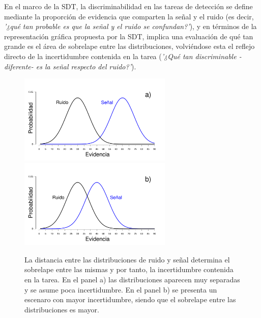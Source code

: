 En el marco de la SDT, la discriminabilidad en las tareas de detección se define mediante la proporción de evidencia que comparten la señal y el ruido (es decir, \textit{'¿qué tan probable es que la señal y el ruido se confundan?'}), y en términos de la representación gráfica propuesta por la SDT, implica una evaluación de qué tan grande es el área de sobrelape entre las distribuciones, volviéndose esta el reflejo directo de la incertidumbre contenida en la tarea (\textit{'¿Qué tan discriminable -diferente- es la señal respecto del ruido?'}).\\

\begin{figure}[h]
\centering
\includegraphics[width=0.65\textwidth]{Figures/Overlap_Small}\\ 
\includegraphics[width=0.65\textwidth]{Figures/Overlap_Big} 
\caption[La detección como una tarea con incertidumbre: el sobrelape entre las distribuciones]{La distancia entre las distribuciones de ruido y señal determina el sobrelape entre las mismas y por tanto, la incertidumbre contenida en la tarea. En el panel a) las distribuciones aparecen muy separadas y se asume poca incertidumbre.  En el panel b) se presenta un escenaro con mayor incertidumbre, siendo que el sobrelape entre las distribuciones es mayor.}
\label{fig:Overlap}
\end{figure}

